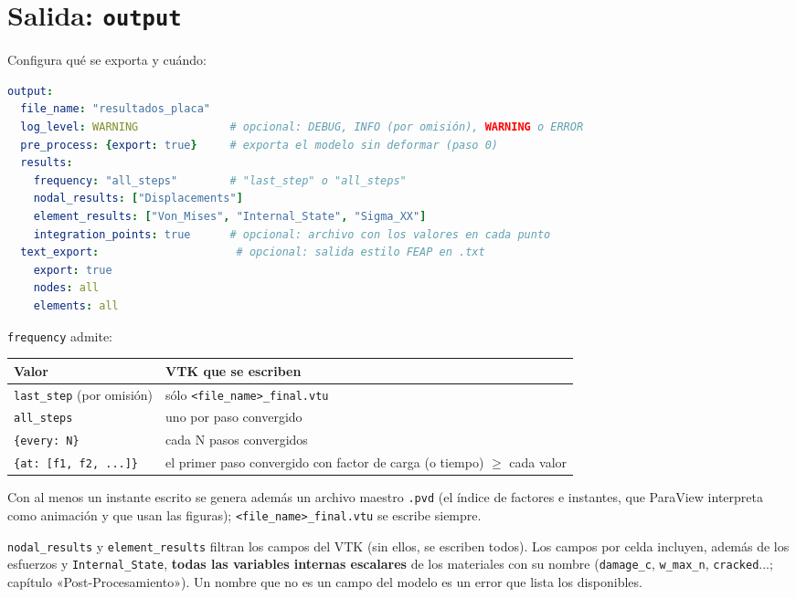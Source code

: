 \documentclass[11pt,oneside]{report}
\begin{document}
\section{Salida: \texttt{output}}

Configura qué se exporta y cuándo:

\begin{lstlisting}[language=yaml]
output:
  file_name: "resultados_placa"
  log_level: WARNING              # opcional: DEBUG, INFO (por omisión), WARNING o ERROR
  pre_process: {export: true}     # exporta el modelo sin deformar (paso 0)
  results:
    frequency: "all_steps"        # "last_step" o "all_steps"
    nodal_results: ["Displacements"]
    element_results: ["Von_Mises", "Internal_State", "Sigma_XX"]
    integration_points: true      # opcional: archivo con los valores en cada punto
  text_export:                     # opcional: salida estilo FEAP en .txt
    export: true
    nodes: all
    elements: all

\end{lstlisting}

\texttt{frequency} admite:

\begin{center}
\begin{tabularx}{\textwidth}{YY}
\hline
\textbf{Valor} & \textbf{VTK que se escriben} \\
\hline
\texttt{\textquotedbl{}last\_step\textquotedbl{}} (por omisión) & sólo \texttt{\textless{}file\_\allowbreak{}name\textgreater{}\_\allowbreak{}final.\allowbreak{}vtu} \\
\texttt{\textquotedbl{}all\_steps\textquotedbl{}} & uno por paso convergido \\
\texttt{\{every: N\}} & cada N pasos convergidos \\
\texttt{\{at: [f1, f2, .\allowbreak{}.\allowbreak{}.\allowbreak{}]\}} & el primer paso convergido con factor de carga (o tiempo) \ensuremath{\ge} cada valor \\
\hline
\end{tabularx}
\end{center}
Con al menos un instante escrito se genera además un archivo maestro \texttt{.pvd} (el índice de factores e instantes, que ParaView interpreta como animación y que usan las figuras); \texttt{\textless{}file\_\allowbreak{}name\textgreater{}\_\allowbreak{}final.\allowbreak{}vtu} se escribe siempre.

\texttt{nodal\_results} y \texttt{element\_results} filtran los campos del VTK (sin ellos, se escriben todos). Los campos por celda incluyen, además de los esfuerzos y \texttt{Internal\_State}, \textbf{todas las variables internas escalares} de los materiales con su nombre (\texttt{damage\_c}, \texttt{w\_max\_n}, \texttt{cracked}...; capítulo «Post-Procesamiento»). Un nombre que no es un campo del modelo es un error que lista los disponibles.
\end{document}
